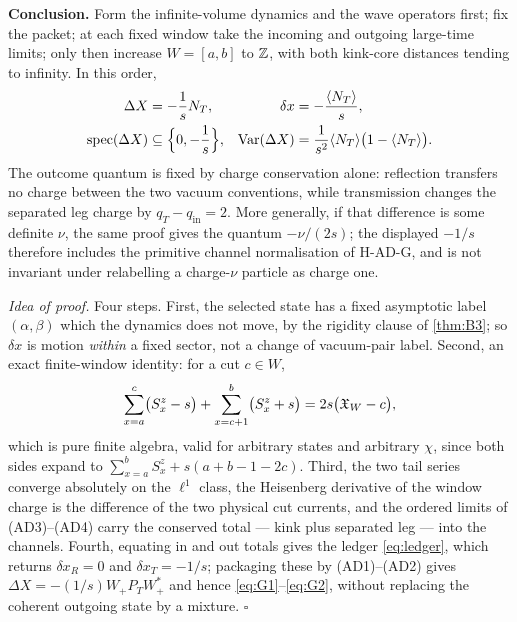 \begin{theorem}
\smallskip
\noindent\textbf{Conclusion.} Form the infinite-volume dynamics and the wave
operators first; fix the packet; at each fixed window take the incoming and
outgoing large-time limits; only then increase $W=[a,b]$ to $\mathbb{Z}$, with both
kink-core distances tending to infinity. In this order,
\begin{align}
  \Delta X&=-\frac{1}{s}N_T,
  &\delta x&=-\frac{\langle N_T\rangle}{s},
  \label{eq:G1}\\
  \operatorname{spec}(\Delta X)&\subseteq\Bigl\{0,-\frac1s\Bigr\},
  &\operatorname{Var}(\Delta X)
   &=\frac{1}{s^2}\langle N_T\rangle\bigl(1-\langle N_T\rangle\bigr).
  \label{eq:G2}
\end{align}
The outcome quantum is fixed by charge conservation alone: reflection transfers
no charge between the two vacuum conventions, while transmission changes the
separated leg charge by $q_T-q_{\mathrm{in}}=2$. More generally, if that
difference is some definite $\nu$, the same proof gives the quantum
$-\nu/(2s)$; the displayed $-1/s$ therefore includes the primitive channel
normalisation of H-AD-G, and is not invariant under relabelling a charge-$\nu$
particle as charge one.
\end{theorem}

\noindent\emph{Idea of proof.} Four steps. First, the selected state has a
fixed asymptotic label $(\alpha,\beta)$ which the dynamics does not move, by
the rigidity clause of \cref{thm:B3}; so $\delta x$ is motion \emph{within} a
fixed sector, not a change of vacuum-pair label. Second, an exact finite-window
identity: for a cut $c\in W$,
\begin{equation}
  \sum_{x=a}^{c}\bigl(S^z_x-s\bigr)+\sum_{x=c+1}^{b}\bigl(S^z_x+s\bigr)
  =2s\bigl(\mathfrak{X}_W-c\bigr),
  \label{eq:G3}
\end{equation}
which is pure finite algebra, valid for arbitrary states and arbitrary $\chi$,
since both sides expand to $\sum_{x=a}^{b}S^z_x+s(a+b-1-2c)$. Third, the two
tail series converge absolutely on the $\ell^1$ class, the Heisenberg
derivative of the window charge is the difference of the two physical cut
currents, and the ordered limits of (AD3)--(AD4) carry the conserved total ---
kink plus separated leg --- into the channels. Fourth, equating in and out
totals gives the ledger \eqref{eq:ledger}, which returns $\delta x_R=0$ and
$\delta x_T=-1/s$; packaging these by (AD1)--(AD2) gives
$\Delta X=-(1/s)W_+P_TW_+^*$ and hence \eqref{eq:G1}--\eqref{eq:G2}, without
replacing the coherent outgoing state by a mixture. \hfill$\square$

